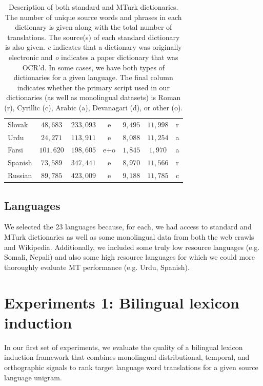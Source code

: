 \documentclass[11pt]{article}
\begin{document}
\begin{table}
\begin{center}
\begin{tabular}{|l||c|c|c||c|c||c|}
Slovak  & $48,683$ & $233,093$   & e  & $9,495$ & $11,998$ & r \\
Urdu  & $24,271$ &  $113,911$  & e & $8,088$ & $11,254$ & a \\
Farsi  & $101,620$ &  $198,605$  &  e+o & $1,845$ & $1,970$ & a \\
Spanish  &  $73,589$  & $347,441$ & e  & $8,970$ & $11,566$ & r \\
Russian  & $89,785$ & $423,009$ & e & $9,188$ & $11,785$ & c \\
\hline
\end{tabular}
\end{center}
\caption{\label{table:dicts}Description of both standard and MTurk dictionaries. The number of unique source words and phrases in each dictionary is given along with the total number of translations. The source(s) of each standard dictionary is also given. {\it e} indicates that a dictionary was originally electronic and {\it o} indicates a paper dictionary that was OCR'd. In some cases, we have both types of dictionaries for a given language. The final column indicates whether the primary script used in our dictionaries (as well as monolingual datasets) is Roman (r), Cyrillic (c), Arabic (a), Devanagari (d), or other (o).}
\end{table}

\subsection{Languages}
We selected the 23 languages because, for each, we had access to standard and MTurk dictionaries as well as some monolingual data from both the web crawls and Wikipedia. Additionally, we included some truly low resource languages (e.g. Somali, Nepali) and also some high resource languages for which we could more thoroughly evaluate MT performance (e.g. Urdu, Spanish).

\section{Experiments 1: Bilingual lexicon induction}\label{sec:lexinduc}
In our first set of experiments, we evaluate the quality of a bilingual lexicon induction framework that combines monolingual distributional, temporal, and orthographic signals to rank target language word translations for a given source language unigram. 
\end{document}
